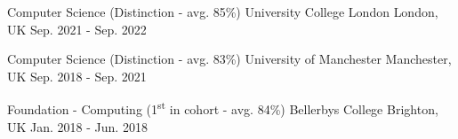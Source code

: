 

\begin{cventries}

  \eduentry
    {Computer Science (Distinction - avg. 85\%)} %
    {University College London} %
    {London, UK} %
    {Sep. 2021 - Sep. 2022} %
    {
    }
    
  \eduentry
    {Computer Science (Distinction - avg. 83\%)} %
    {University of Manchester} %
    {Manchester, UK} %
    {Sep. 2018 - Sep. 2021} %
    {
    }
    
  \eduentry
    {Foundation - Computing (1\textsuperscript{st} in cohort - avg. 84\%)} %
    {Bellerbys College} %
    {Brighton, UK} %
    {Jan. 2018 - Jun. 2018} %
    {
    }
    

\end{cventries}
